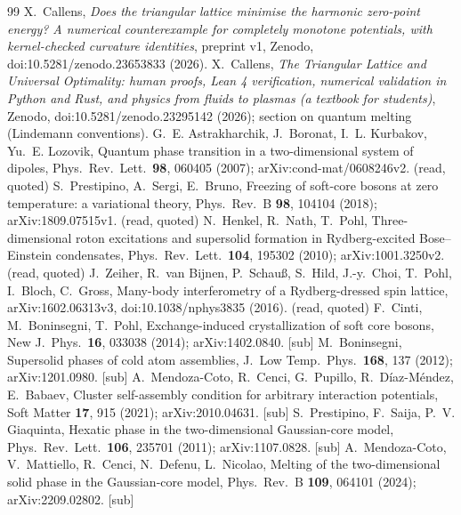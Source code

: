 \documentclass[10pt]{article}
\newcommand{\sub}{\textsf{[sub]}}
\begin{document}
\begin{thebibliography}{99}\small\setlength\itemsep{1pt}
 X.~Callens, \emph{Does the triangular lattice minimise the harmonic zero-point energy? A numerical counterexample for completely monotone potentials, with kernel-checked curvature identities}, preprint v1, Zenodo, doi:10.5281/zenodo.23653833 (2026).
 X.~Callens, \emph{The Triangular Lattice and Universal Optimality: human proofs, Lean 4 verification, numerical validation in Python and Rust, and physics from fluids to plasmas (a textbook for students)}, Zenodo, doi:10.5281/zenodo.23295142 (2026); section on quantum melting (Lindemann conventions).
 G.~E. Astrakharchik, J.~Boronat, I.~L. Kurbakov, Yu.~E. Lozovik, Quantum phase transition in a two-dimensional system of dipoles, Phys.\ Rev.\ Lett.\ \textbf{98}, 060405 (2007); arXiv:cond-mat/0608246v2. (read, quoted)
 S.~Prestipino, A.~Sergi, E.~Bruno, Freezing of soft-core bosons at zero temperature: a variational theory, Phys.\ Rev.\ B \textbf{98}, 104104 (2018); arXiv:1809.07515v1. (read, quoted)
 N.~Henkel, R.~Nath, T.~Pohl, Three-dimensional roton excitations and supersolid formation in Rydberg-excited Bose--Einstein condensates, Phys.\ Rev.\ Lett.\ \textbf{104}, 195302 (2010); arXiv:1001.3250v2. (read, quoted)
 J.~Zeiher, R.~van Bijnen, P.~Schau\ss, S.~Hild, J.-y.~Choi, T.~Pohl, I.~Bloch, C.~Gross, Many-body interferometry of a Rydberg-dressed spin lattice, arXiv:1602.06313v3, doi:10.1038/nphys3835 (2016). (read, quoted)
 F.~Cinti, M.~Boninsegni, T.~Pohl, Exchange-induced crystallization of soft core bosons, New J.\ Phys.\ \textbf{16}, 033038 (2014); arXiv:1402.0840. \sub
{} M.~Boninsegni, Supersolid phases of cold atom assemblies, J.\ Low Temp.\ Phys.\ \textbf{168}, 137 (2012); arXiv:1201.0980. \sub
{} A.~Mendoza-Coto, R.~Cenci, G.~Pupillo, R.~D\'iaz-M\'endez, E.~Babaev, Cluster self-assembly condition for arbitrary interaction potentials, Soft Matter \textbf{17}, 915 (2021); arXiv:2010.04631. \sub
{} S.~Prestipino, F.~Saija, P.~V. Giaquinta, Hexatic phase in the two-dimensional Gaussian-core model, Phys.\ Rev.\ Lett.\ \textbf{106}, 235701 (2011); arXiv:1107.0828. \sub
{} A.~Mendoza-Coto, V.~Mattiello, R.~Cenci, N.~Defenu, L.~Nicolao, Melting of the two-dimensional solid phase in the Gaussian-core model, Phys.\ Rev.\ B \textbf{109}, 064101 (2024); arXiv:2209.02802. \sub
\end{thebibliography}
\end{document}
